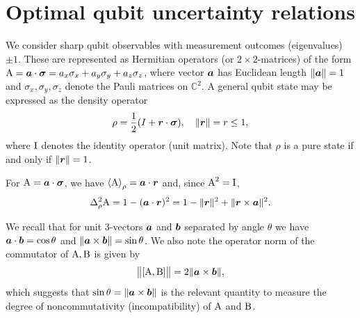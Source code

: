 \section{Optimal qubit uncertainty relations}\label{sec:qubit}

We consider sharp qubit observables with measurement outcomes (eigenvalues) $\pm 1$. These are represented as Hermitian operators (or $2\times 2$-matrices) of the form $\operatorname{A}=\bm{a}\cdot{\boldsymbol\sigma}=a_x\sigma_x+a_y\sigma_y+a_z\sigma_z$, where vector $\bm{a}$ has Euclidean length  $\|\bm{a}\|=1$ and  $\sigma_x,\sigma_y,\sigma_z$ denote the Pauli matrices on ${\mathbb C}^2$. A general qubit state may be expressed as the density operator
\begin{equation}
  \rho=\frac12(I+\bm{r}\cdot{\boldsymbol\sigma}),\quad \|\bm{r}\|=r\le 1,
\end{equation}
where $\operatorname{I}$ denotes the identity operator (unit matrix). Note that $\rho$ is a pure state if and only if $\|\bm{r}\|=1$.

For $\operatorname{A}=\bm{a}\cdot{\boldsymbol\sigma}$, we have  $\left\langle {\operatorname{A}}\right\rangle_\rho=\bm{a}\cdot\bm{r}$ and, since $\operatorname{A}^2=\operatorname{I}$,
\begin{equation}
  \varr{\opa}=1-(\boa\cdot\bor)^2=1-\|\bor\|^2+\|\bor\times\boa\|^2.
\end{equation}

We recall  that for unit 3-vectors $\bm{a}$ and $\bm{b}$ separated by angle $\theta$ we have $\bm{a}\cdot\bm{b}=\cos\theta$ and $\|\bm{a}\times\bm{b}\| = \sin\theta$.
We also note  the operator norm of the commutator of $\operatorname{A},\operatorname{B}$ is given by
\begin{equation}
  \bigl\|[\operatorname{A},\operatorname{B}]\bigr\| = 2\|\bm{a}\times\bm{b}\|,
\end{equation}
which suggests that $\sin\theta=\|\bm{a}\times\bm{b}\|$ is the relevant quantity to measure the degree of noncommutativity (incompatibility) of $\operatorname{A}$ and $\operatorname{B}$.


